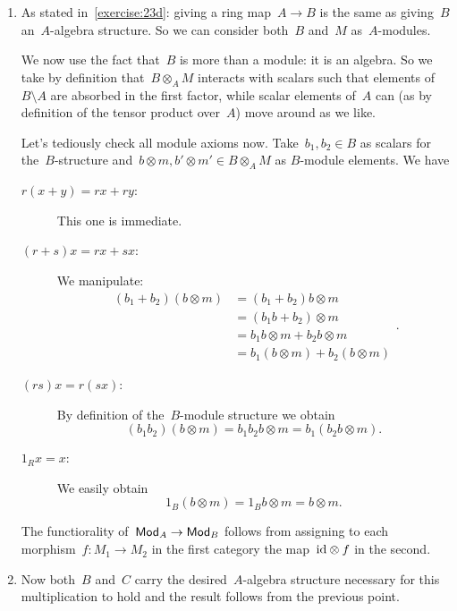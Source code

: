 \begin{exercise} %
  \begin{enumerate}
    \item As stated in~\autoref{exercise:23d}: giving a ring map~$A\to B$ is the same as giving~$B$ an~$A$\nobreakdash-algebra structure. So we can consider both~$B$ and~$M$ as~$A$\nobreakdash-modules.

      We now use the fact that~$B$ is more than a module: it is an algebra. So we take by definition that~$B\otimes_A M$ interacts with scalars such that elements of~$B\setminus A$ are absorbed in the first factor, while scalar elements of~$A$ can (as by definition of the tensor product over~$A$) move around as we like.
      
      Let's tediously check all module axioms now. Take~$b_1,b_2\in B$ as scalars for the~$B$\nobreakdash-structure and~$b\otimes m,b'\otimes m'\in B\otimes_A M$ as $B$\nobreakdash-module elements. We have
      \begin{description}
        \item[$r(x+y)=rx+ry$:] This one is immediate.

        \item[$(r+s)x=rx+sx$:] We manipulate:
          \begin{equation}
            \begin{aligned}
              (b_1+b_2)(b\otimes m)&=(b_1+b_2)b\otimes m \\
              &=(b_1b+b_2)\otimes m \\
              &=b_1b\otimes m+b_2b\otimes m \\
              &=b_1(b\otimes m)+b_2(b\otimes m)
            \end{aligned}.
          \end{equation}

        \item[$(rs)x=r(sx)$:] By definition of the~$B$\nobreakdash-module structure we obtain
          \begin{equation}
            (b_1b_2)(b\otimes m)=b_1b_2b\otimes m=b_1(b_2b\otimes m).
          \end{equation}

        \item[$1_Rx=x$:] We easily obtain
          \begin{equation}
            1_B(b\otimes m)=1_Bb\otimes m=b\otimes m.
          \end{equation}
      \end{description}

      The functiorality of~$\mathsf{Mod}_A\to\mathsf{Mod}_B$ follows from assigning to each morphism~$f\colon M_1\to M_2$ in the first category the map~$\mathrm{id}\otimes f$ in the second.

    \item Now both~$B$ and~$C$ carry the desired~$A$\nobreakdash-algebra structure necessary for this multiplication to hold and the result follows from the previous point.
  \end{enumerate}
\end{exercise}

